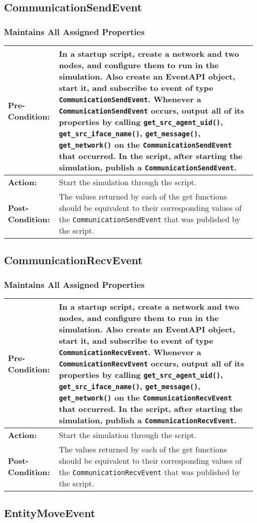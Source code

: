 \documentclass[titlepage]{article}
\newcommand{\testcase}[3]{
    \begin{center}
    \begin{tabular}{| l | p{0.7\textwidth}|}
        \hline
        \rowcolor[gray]{0.8}\textbf{Pre-Condition:} & #1 \\ \hline
        \textbf{Action:} & #2 \\ \hline
        \rowcolor[gray]{0.8}\textbf{Post-Condition:} & #3 \\ \hline
    \end{tabular}
    \end{center}
}
\begin{document}
\subsection{CommunicationSendEvent}
\subsubsection{Maintains All Assigned Properties}
\testcase{In a startup script, create a network and two nodes, and configure them to run in the simulation. Also create an EventAPI object, start it, and subscribe to event of type \texttt{CommunicationSendEvent}. Whenever a \texttt{CommunicationSendEvent} occurs, output all of its properties by calling \texttt{get\_src\_agent\_uid()}, \texttt{get\_src\_iface\_name()}, \texttt{get\_message()}, \texttt{get\_network()} on the \texttt{CommunicationSendEvent} that occurred. In the script, after starting the simulation, publish a \texttt{CommunicationSendEvent}.}{Start the simulation through the script.}{The values returned by each of the get functions should be equivalent to their corresponding values of the \texttt{CommunicationSendEvent} that was published by the script.}

\subsection{CommunicationRecvEvent}
\subsubsection{Maintains All Assigned Properties}
\testcase{In a startup script, create a network and two nodes, and configure them to run in the simulation. Also create an EventAPI object, start it, and subscribe to event of type \texttt{CommunicationRecvEvent}. Whenever a \texttt{CommunicationRecvEvent} occurs, output all of its properties by calling \texttt{get\_src\_agent\_uid()}, \texttt{get\_src\_iface\_name()}, \texttt{get\_message()}, \texttt{get\_network()} on the \texttt{CommunicationRecvEvent} that occurred. In the script, after starting the simulation, publish a \texttt{CommunicationRecvEvent}.}{Start the simulation through the script.}{The values returned by each of the get functions should be equivalent to their corresponding values of the \texttt{CommunicationRecvEvent} that was published by the script.}

\subsection{EntityMoveEvent}
\end{document}

